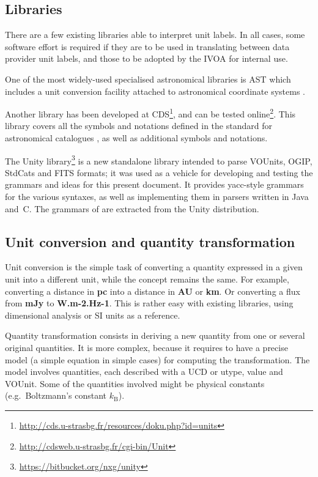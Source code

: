 \documentclass[11pt,notitlepage,onecolumn]{ivoa}
\def\eg{e.g.~}
\newcommand{\unit}[1]{\textbf{\textsf{\color{orange}#1}}}
\begin{document}
\subsection{Libraries\label{sec:libraries}}

There are a few existing libraries able to interpret unit labels.
In all cases,
some software effort is required if they are to be used in translating
between data provider unit labels, and those to be adopted by
the IVOA for internal use.

One of the most widely-used specialised
astronomical libraries is AST which includes a unit conversion
facility attached to astronomical coordinate systems \citep{berry12}.

Another library has been developed at
CDS\footnote{\url{http://cds.u-strasbg.fr/resources/doku.php?id=units}},
and can be tested online\footnote{\url{http://cdsweb.u-strasbg.fr/cgi-bin/Unit}}. This library covers all
the symbols and notations defined in the standard for astronomical catalogues \citep[\S3.2]{cds00}, as well as
additional symbols and notations.

The Unity library\footnote{\url{https://bitbucket.org/nxg/unity}} is a new
standalone library intended to parse VOUnits, OGIP, StdCats and FITS
formats; it was used as a vehicle for developing and testing the grammars and
ideas for this present document.  It provides yacc-style grammars for
the various syntaxes, as well as implementing them in parsers written
in Java and~C.  The grammars of  are extracted
from the Unity distribution.

\subsection{Unit conversion and quantity transformation\label{sec:conversion}}

Unit conversion is the simple task of converting a quantity expressed in a given unit into a different unit, while
the concept remains the same. For example, converting a distance in \unit{pc} into a distance in \unit{AU} or \unit{km}.
Or converting a flux from \unit{mJy} to \unit{W.m-2.Hz-1}. This is rather easy with existing libraries, using dimensional
analysis or SI units as a reference.

Quantity transformation consists in deriving a new quantity from one or several original
quantities. It is more complex, because it requires to have a precise model 
(a simple equation in simple cases) for computing the transformation. The model involves
quantities, each described with a UCD or utype, value and VOUnit. Some of the quantities
involved might be physical constants (\eg  Boltzmann's constant $k_{\mathrm{B}}$).
\end{document}
